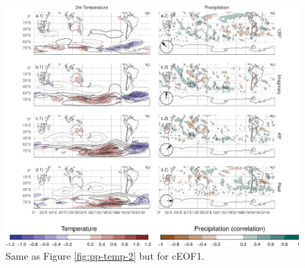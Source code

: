\documentclass[smallextended]{svjour3}       %
\begin{document}
\begin{figure}
\centering
\includegraphics{../figures/pp-temp-1-1.pdf}
\caption{\label{fig:pp-temp-1}Same as Figure \ref{fig:pp-temp-2} but for cEOF1.}
\end{figure}
\end{document}
